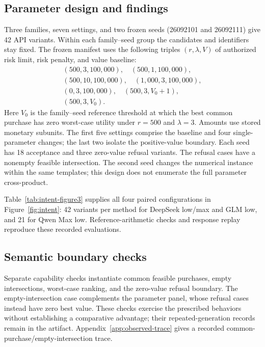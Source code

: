 \subsection{Parameter design and findings}
Three families, seven settings, and two frozen seeds (26092101 and 26092111) give 42 API variants. Within each family--seed group the candidates and identifiers stay fixed. The frozen manifest uses the following triples $(r,\lambda,V)$ of authorized risk limit, risk penalty, and value baseline:
\[
\begin{gathered}
(500,3,100{,}000),\quad (500,1,100{,}000),\\
(500,10,100{,}000),\quad (1{,}000,3,100{,}000),\\
(0,3,100{,}000),\quad (500,3,V_0+1),\\
(500,3,V_0).
\end{gathered}
\]
Here $V_0$ is the family--seed reference threshold at which the best common purchase has zero worst-case utility under $r=500$ and $\lambda=3$. Amounts use stored monetary subunits. The first five settings comprise the baseline and four single-parameter changes; the last two isolate the positive-value boundary. Each seed has 18 acceptance and three zero-value refusal variants. The refusal cases have a nonempty feasible intersection. The second seed changes the numerical instance within the same templates; this design does not enumerate the full parameter cross-product.

Table~\ref{tab:intent-figure3} supplies all four paired configurations in Figure~\ref{fig:intent}: 42 variants per method for DeepSeek low/max and GLM low, and 21 for Qwen Max low. Reference-arithmetic checks and response replay reproduce these recorded evaluations.

\begin{table}[!tbp]
\centering\small
\setlength{\tabcolsep}{6pt}

\caption{Complete results underlying Figure~\ref{fig:intent}. Each arrow is Direct$\to$SET; $n$ is the number of matched tasks per method. Exact, unsafe acceptance, false refusal, and Other form a disjoint partition of each method's $n$ outcomes. Other includes remaining value and execution failures. The four rows contain 294 evaluations in total and are separate from the primary 200-task benchmark.}
\label{tab:intent-figure3}
\end{table}

\subsection{Semantic boundary checks}
\label{app:intent-boundaries}
Separate capability checks instantiate common feasible purchases, empty intersections, worst-case ranking, and the zero-value refusal boundary. The empty-intersection case complements the parameter panel, whose refusal cases instead have zero best value. These checks exercise the prescribed behaviors without establishing a comparative advantage; their repeated-generation records remain in the artifact. Appendix~\ref{app:observed-trace} gives a recorded common-purchase/empty-intersection trace.
